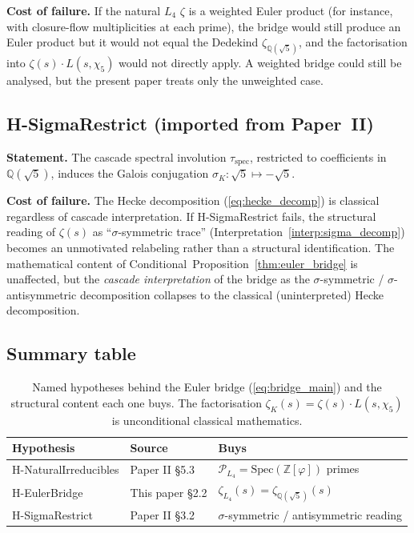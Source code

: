 \documentclass[11pt,a4paper]{article}
\theoremstyle{definition}
\theoremstyle{remark}
\begin{document}
\textbf{Cost of failure.} If the natural $L_4$ $\zeta$ is a weighted
Euler product (for instance, with closure-flow multiplicities at each
prime), the bridge would still produce an Euler product but it would
not equal the Dedekind $\zeta_{\mathbb{Q}(\sqrt{5})}$, and the
factorisation into $\zeta(s) \cdot L(s, \chi_5)$ would not directly
apply. A weighted bridge could still be analysed, but the present paper
treats only the unweighted case.

\subsection{H-SigmaRestrict (imported from Paper~II)}

\textbf{Statement.} The cascade spectral involution $\tau_{\mathrm{spec}}$,
restricted to coefficients in $\mathbb{Q}(\sqrt{5})$, induces the
Galois conjugation $\sigma_K : \sqrt{5} \mapsto -\sqrt{5}$.

\textbf{Cost of failure.} The Hecke decomposition
(\ref{eq:hecke_decomp}) is classical regardless of cascade
interpretation. If H-SigmaRestrict fails, the structural reading of
$\zeta(s)$ as ``$\sigma$-symmetric trace'' (Interpretation~\ref{interp:sigma_decomp})
becomes an unmotivated relabeling rather than a structural
identification. The mathematical content of
Conditional~Proposition~\ref{thm:euler_bridge} is unaffected, but the
\emph{cascade interpretation} of the bridge as the
$\sigma$-symmetric / $\sigma$-antisymmetric decomposition collapses to
the classical (uninterpreted) Hecke decomposition.

\subsection{Summary table}

\begin{table}[h]
\centering
\renewcommand{\arraystretch}{1.2}
\begin{tabular}{lll}
\toprule
\textbf{Hypothesis} & \textbf{Source} & \textbf{Buys} \\
\midrule
H-NaturalIrreducibles & Paper II \S 5.3 & $\mathcal{P}_{L_4} = \mathrm{Spec}(\mathbb{Z}[\varphi])$ primes \\
H-EulerBridge & This paper \S 2.2 & $\zeta_{L_4}(s) = \zeta_{\mathbb{Q}(\sqrt{5})}(s)$ \\
H-SigmaRestrict & Paper II \S 3.2 & $\sigma$-symmetric / antisymmetric reading \\
\bottomrule
\end{tabular}
\caption{Named hypotheses behind the Euler bridge (\ref{eq:bridge_main})
and the structural content each one buys. The factorisation
$\zeta_K(s) = \zeta(s) \cdot L(s, \chi_5)$ is unconditional classical
mathematics.}\label{tab:hypotheses}
\end{table}
\end{document}
